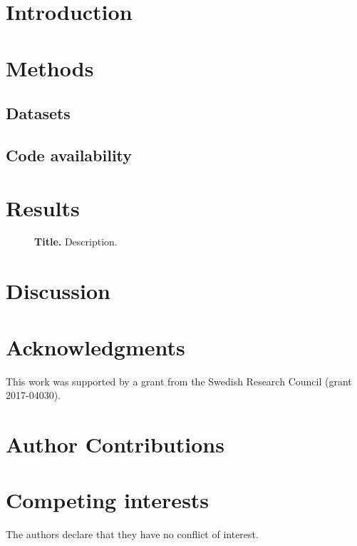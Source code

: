 \documentclass[11pt]{article}
\renewcommand{\includegraphics}[2][]{}
\begin{document}
\maketitle


\begin{abstract}

\end{abstract}

\section*{Introduction}

\section*{Methods}
\subsection*{Datasets}
\subsection*{Code availability}

\section*{Results}

\begin{figure}[htp]
\begin{center}
\caption{\label{fig:id-stats} {\bf Title.} Description.}
\end{center}
\end{figure}

\section*{Discussion}


\section*{Acknowledgments}

This work was supported by a grant from the Swedish Research Council (grant
2017-04030).

\section*{Author Contributions}

\section*{Competing interests}

The authors declare that they have no conflict of interest.
\end{document}
